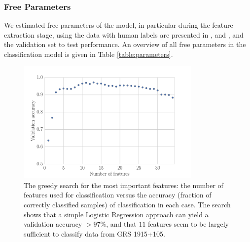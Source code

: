 \documentclass[12pt]{emulateapj}
\begin{document}
\subsubsection{Free Parameters}
\label{sec:freeparams}

We estimated free parameters of the model, in particular during the feature extraction stage, using the data with human labels are presented in \citet{belloni2000}, \citet{kleinwolt2002} and \citet{hannikainen2003}, and the validation set to test performance. An overview of all free parameters in the classification model is given in Table \ref{table:parameters}.

\begin{figure}[htbp]
\begin{center}
\includegraphics[width=9cm]{grs1915_feature_accuracy}
\caption{The greedy search for the most important features: the number of features used for classification versus the accuracy (fraction of correctly classified samples) of classification in each case. The search shows that a simple Logistic Regression approach can yield a validation accuracy $>97\%$, and that $11$ features seem to be largely sufficient to classify data from GRS 1915+105.}
\label{fig:scores}
\end{center}
\end{figure}
\end{document}

